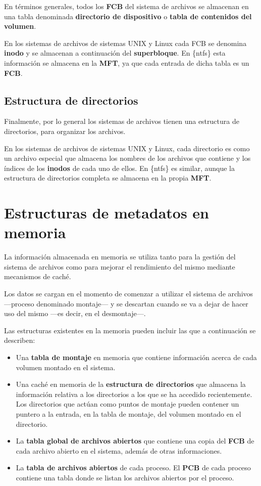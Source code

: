 En términos generales, todos los \textbf{FCB} del sistema de archivos se
almacenan en una tabla denominada \textbf{directorio de dispositivo}{} o
\textbf{tabla de contenidos del volumen}{}.

En los sistemas de archivos de sistemas UNIX y Linux cada FCB se
denomina \textbf{{}inodo} y se almacenan a continuación del
\textbf{superbloque}. En \{ntfs\} esta información se almacena en la
\textbf{MFT}, ya que cada entrada de dicha tabla es un \textbf{FCB}.

\subsection{Estructura de directorios}\label{_estructura_de_directorios}

Finalmente, por lo general los sistemas de archivos tienen una
estructura de directorios, para organizar los archivos.

En los sistemas de archivos de sistemas UNIX y Linux, cada directorio es
como un archivo especial que almacena los nombres de los archivos que
contiene y los índices de los \textbf{inodos} de cada uno de ellos. En
\{ntfs\} es similar, aunque la estructura de directorios completa se
almacena en la propia \textbf{MFT}.

\section{Estructuras de metadatos en
memoria}\label{_estructuras_de_metadatos_en_memoria}

La información almacenada en memoria se utiliza tanto para la gestión
del sistema de archivos como para mejorar el rendimiento del mismo
mediante mecanismos de caché.

Los datos se cargan en el momento de comenzar a utilizar el sistema de
archivos ---proceso denominado montaje--- y se descartan cuando se va a
dejar de hacer uso del mismo ---es decir, en el desmontaje---.

Las estructuras existentes en la memoria pueden incluir las que a
continuación se describen:

\begin{itemize}
\item
  Una \textbf{tabla de montaje}{} en memoria que contiene información
  acerca de cada volumen montado en el sistema.
\item
  Una caché en memoria de la \textbf{estructura de directorios} que
  almacena la información relativa a los directorios a los que se ha
  accedido recientemente. Los directorios que actúan como puntos de
  montaje pueden contener un puntero a la entrada, en la tabla de
  montaje, del volumen montado en el directorio.
\item
  La \textbf{tabla global de archivos abiertos}{} que contiene una copia
  del \textbf{FCB} de cada archivo abierto en el sistema, además de
  otras informaciones.
\item
  La \textbf{tabla de archivos abiertos}{} de cada proceso. El
  \textbf{PCB} de cada proceso contiene una tabla donde se listan los
  archivos abiertos por el proceso.
\end{itemize}


